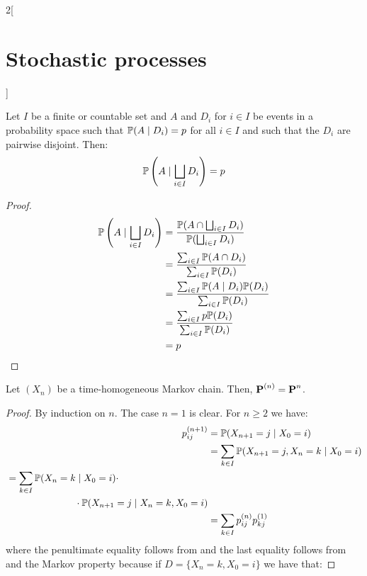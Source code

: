 \documentclass[../../../main_math.tex]{subfiles}
\begin{document}
\begin{multicols}{2}[\section{Stochastic processes}]
  \begin{lemma}\label{SP:lema2Markov}
    Let $I$ be a finite or countable set and $A$ and $D_i$ for $i\in I$ be events in a probability space such that $\mathbb{P}(A\mid D_i)=p$ for all $i\in I$ and such that the $D_i$ are pairwise disjoint. Then:
    $$\mathbb{P}\left(A\mid \bigsqcup_{i\in I}D_i\right)=p$$
  \end{lemma}
  \begin{proof}
    \begin{align*}
      \mathbb{P}\left(A\mid \bigsqcup_{i\in I}D_i\right) & =\frac{\mathbb{P}(A\cap \bigsqcup_{i\in I}D_i)}{\mathbb{P}(\bigsqcup_{i\in I}D_i)} \\
                                                    & =\frac{\sum_{i\in I}\mathbb{P}(A\cap D_i)}{\sum_{i\in I}\mathbb{P}(D_i)}           \\
                                                    & =\frac{\sum_{i\in I}\mathbb{P}(A\mid D_i)\mathbb{P}(D_i)}{\sum_{i\in I}\mathbb{P}(D_i)} \\
                                                    & =\frac{\sum_{i\in I}p\mathbb{P}(D_i)}{\sum_{i\in I}\mathbb{P}(D_i)}                \\
                                                    & =p
    \end{align*}
  \end{proof}
  \begin{theorem}
    Let $(X_n)$ be a time-homogeneous Markov chain. Then, $\boldsymbol{\mathrm{P}}^{(n)}=\boldsymbol{\mathrm{P}}^n$.
  \end{theorem}
  \begin{proof}
    By induction on $n$. The case $n=1$ is clear. For $n\geq 2$ we have:
    \begin{align*}
      p_{ij}^{(n+1)} & =\mathbb{P}(X_{n+1}=j\mid X_0=i)                     \\
                     & =\sum_{k\in I}\mathbb{P}(X_{n+1}=j, X_n=k\mid X_0=i) \\
      \begin{split}
        &=\sum_{k\in I}\mathbb{P}(X_{n}=k\mid X_0=i)\cdot\\
        &\hspace{2.5cm}\cdot\mathbb{P}(X_{n+1}=j\mid X_n=k, X_0=i)
      \end{split}             \\
                     & =\sum_{k\in I}p_{ij}^{(n)}p_{kj}^{(1)}
    \end{align*}
    where the penultimate equality follows from  and the last equality follows from  and the Markov property because if $D=\{X_n=k, X_0=i\}$ we have that:

\end{proof}
\end{multicols}
\end{document}
